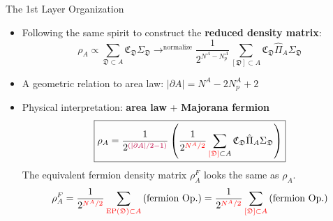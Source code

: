\documentclass[professionalfont,
                xcolor=dvipsnames]{beamer}
\newcommand{\anglelr}[1]{\left\langle #1 \right\rangle}
\newcommand{\abs}[1]{\left| #1 \right|}
\newcommand{\de}{\partial}
\newcommand{\lr}[1]{\left(#1\right)}
\newcommand{\mrm}[1]{\mathrm{#1}}
\newcommand{\tr}{\mrm{Tr}}
\begin{document}
\begin{frame}{The 1st Layer Organization}
    \begin{itemize}
        \item Following the same spirit to construct the \textbf{reduced density matrix}: 
        \[
        \rho_A 
        \propto \sum_{\mathfrak{D}\subset A} \mathfrak{C}_{\mathfrak{D}} \Sigma_{\mathfrak{D}} 
        \mathop{\longrightarrow}^{\text{normalize}}
        \boxed{
            \frac{1}{2^{N^A-N^A_p}}  \sum_{[\mathfrak{D}]\subset A} \mathfrak{C}_\mathfrak{D} \hat{\Pi}_A\Sigma_{\mathfrak{D}} 
        }
        \]
        \item A geometric relation to area law: $\boxed{\abs{\de A} = N^A - 2N^A_p + 2}$
        \item Physical interpretation: \textbf{\color{purple} area law} + \textbf{\color{red} Majorana fermion}
        \[
        \boxed{
            \rho_A 
            = 
            \frac{1}{2^{ {\color{purple}\lr{\abs{\de A}/2 - 1}}}} 
            \lr{
                \frac{1}{2^{\color{red} N^A/2}} 
                \sum_{{\color{red} [\mathfrak{D}]} \subset A}
                \mathfrak{C}_\mathfrak{D} \hat{\Pi}_A
                \Sigma_{\mathfrak{D}}
            }
        }
        \]
        The equivalent fermion density matrix $\rho_A^F$ looks the same as $\rho_A$. 
        \[
        \rho_A^F = \frac{1}{2^{\color{red} N^A/2}}\sum_{ \color{red} \mrm{EP}(\mathfrak{D})\subset A}\lr{\text{fermion Op.}} 
        = 
        \frac{1}{2^{\color{red} N^A/2}}\sum_{\color{red} [\mathfrak{D}]\subset A}\lr{\text{fermion Op.}}
        \]
    \end{itemize}
\end{frame}
\end{document}
